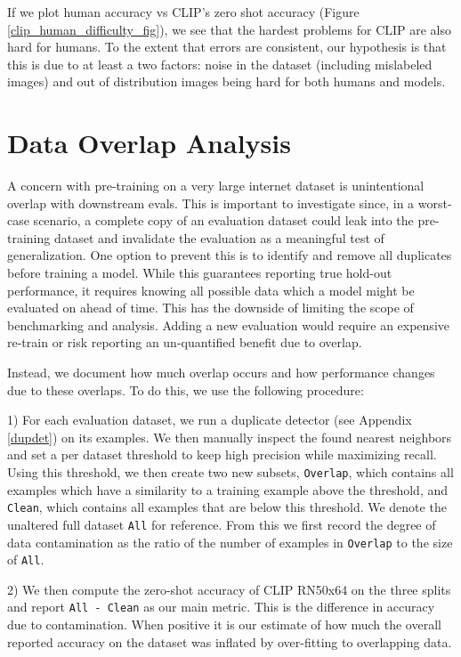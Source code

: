 If we plot human accuracy vs CLIP’s zero shot accuracy (Figure \ref{clip_human_difficulty_fig}), we see that the hardest problems for CLIP are also hard for humans. To the extent that errors are consistent, our hypothesis is that this is due to at least a two factors: noise in the dataset (including mislabeled images) and out of distribution images being hard for both humans and models.

\section{Data Overlap Analysis}

A concern with pre-training on a very large internet dataset is unintentional overlap with downstream evals. This is important to investigate since, in a worst-case scenario, a complete copy of an evaluation dataset could leak into the pre-training dataset and invalidate the evaluation as a meaningful test of generalization. One option to prevent this is to identify and remove all duplicates before training a model. While this guarantees reporting true hold-out performance, it requires knowing all possible data which a model might be evaluated on ahead of time. This has the downside of limiting the scope of benchmarking and analysis. Adding a new evaluation would require an expensive re-train or risk reporting an un-quantified benefit due to overlap. 

Instead, we document how much overlap occurs and how performance changes due to these overlaps. To do this, we use the following procedure:

1) For each evaluation dataset, we run a duplicate detector (see Appendix \ref{dupdet}) on its examples. We then manually inspect the found nearest neighbors and set a per dataset threshold to keep high precision while maximizing recall. Using this threshold, we then create two new subsets, \texttt{Overlap}, which contains all examples which have a similarity to a training example above the threshold, and \texttt{Clean}, which contains all examples that are below this threshold. We denote the unaltered full dataset \texttt{All} for reference. From this we first record the degree of data contamination as the ratio of the number of examples in \texttt{Overlap} to the size of \texttt{All}.

2) We then compute the zero-shot accuracy of CLIP RN50x64 on the three splits and report \texttt{All - Clean} as our main metric. This is the difference in accuracy due to contamination. When positive it is our estimate of how much the overall reported accuracy on the dataset was inflated by over-fitting to overlapping data.

